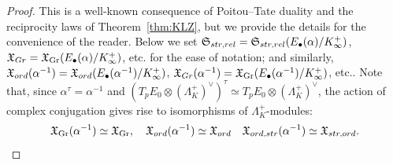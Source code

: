 \documentclass[10pt,a4paper]{amsart}
\DeclareMathOperator{\Gr}{Gr}
\newcommand{\X}{\mathfrak{X}}
\begin{document}
\begin{proof}
This is a well-known consequence of Poitou--Tate duality and the reciprocity laws of Theorem~\ref{thm:KLZ}, but we provide the details for the convenience of the reader. Below we set $\mathfrak{S}_{\rm str,\rm rel}=\mathfrak{S}_{\rm str,\rm rel}(E_\bullet(\alpha)/K_\infty^+)$, $\X_{\rm Gr}=\X_{\Gr}(E_\bullet(\alpha)/K_\infty^+)$, etc. for the ease of notation; and similarly, $\X_{\rm ord}(\alpha^{-1})=\X_{\rm ord}(E_\bullet(\alpha^{-1})/K_\infty^+)$, $\X_{\rm Gr}(\alpha^{-1})=\X_{\Gr}(E_\bullet(\alpha^{-1})/K_\infty^+)$, etc.. Note that, since $\alpha^{\tau}=\alpha^{-1}$ and $(T_pE_{0}\otimes (\Lambda_K^+)^{\vee})^{\tau}\simeq T_pE_{0}\otimes (\Lambda_K^+)^{\vee}$, the action of complex conjugation gives rise to isomorphisms of $\Lambda_K^+$-modules:
\begin{equation}\label{eq:cc}
\X_{\Gr}(\alpha^{-1})\simeq \X_{\Gr}, \ \ \ \X_{\rm ord}(\alpha^{-1})\simeq \X_{\rm ord} \ \ \ \X_{\rm ord, str}(\alpha^{-1})\simeq \X_{\rm str, ord}.
\end{equation}


\end{proof}
\end{document}
